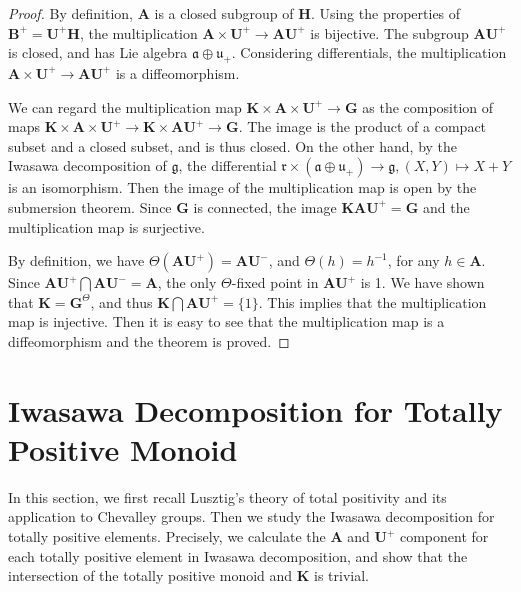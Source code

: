\documentclass[12pt]{amsart}
\begin{document}
\begin{proof}
    By definition, $\mathbf{A}$ is a closed subgroup of $\mathbf{H}$.
    Using the properties of $\mathbf{B}^+=\mathbf{U}^+\mathbf{H}$, the multiplication $\mathbf{A}\times \mathbf{U}^+\rightarrow \mathbf{A}\mathbf{U}^+$ is bijective.
    The subgroup $\mathbf{A}\mathbf{U}^+$ is closed, and has Lie algebra $\mathfrak{a}\oplus \mathfrak{u}_+$.
    Considering differentials, the multiplication $\mathbf{A}\times \mathbf{U}^+\rightarrow \mathbf{A}\mathbf{U}^+$ is a diffeomorphism.

    We can regard the multiplication map $\mathbf{K}\times \mathbf{A}\times \mathbf{U}^+ \rightarrow \mathbf{G}$ as the composition of maps $\mathbf{K}\times \mathbf{A}\times \mathbf{U}^+ \rightarrow \mathbf{K}\times \mathbf{A} \mathbf{U}^+ \rightarrow \mathbf{G} $.
    The image is the product of a compact subset and a closed subset, and is thus closed.
    On the other hand, by the Iwasawa decomposition of $\mathfrak{g}$, the differential $\mathfrak{r}\times (\mathfrak{a}\oplus \mathfrak{u}_+)\rightarrow \mathfrak{g},(X,Y)\mapsto X+Y$ is an isomorphism.
    Then the image of the multiplication map is open by the submersion theorem.
    Since $\mathbf{G}$ is connected, the image $\mathbf{K} \mathbf{A} \mathbf{U}^+=\mathbf{G}$ and the multiplication map is surjective.

    By definition, we have $\Theta(\mathbf{A} \mathbf{U}^+)=\mathbf{A} \mathbf{U}^-$, and $\Theta(h)=h^{-1}$, for any $h\in \mathbf{A}$.
    Since $\mathbf{A} \mathbf{U}^+ \bigcap \mathbf{A} \mathbf{U}^-=\mathbf{A}$, the only $\Theta$-fixed point in $\mathbf{A} \mathbf{U}^+$ is 1.
    We have shown that $\mathbf{K}=\mathbf{G}^{\Theta}$, and thus $\mathbf{K}\bigcap \mathbf{A} \mathbf{U}^+ =\{1\}$.
    This implies that the multiplication map is injective.
    Then it is easy to see that the multiplication map is a diffeomorphism and the theorem is proved.
\end{proof}




\section{Iwasawa Decomposition for Totally Positive Monoid}
In this section, we first recall Lusztig's theory of total positivity and its application to Chevalley groups.
Then we study the Iwasawa decomposition for totally positive elements. 
Precisely, we calculate the $\mathbf{A}$ and $\mathbf{U}^+$ component for each totally positive element in Iwasawa decomposition, and show that the intersection of the totally positive monoid and $\mathbf{K}$ is trivial.
\end{document}
